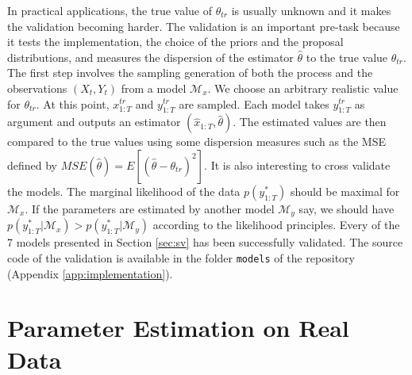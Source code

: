 \documentclass[11pt,a4,twosided,singlespacing,titlepagenumber=on]{scrreprt}
\numberwithin{equation}{chapter} %
\theoremstyle{remark}
\begin{document}
In practical applications, the true value of $\theta_{tr}$ is usually unknown and it makes the validation becoming harder. The validation is an important pre-task because it tests the implementation, the choice of the priors and the proposal distributions, and measures the dispersion of the estimator $\hat{\theta}$ to the true value $\theta_{tr}$. The first step involves the sampling generation of both the process and the observations $(X_t, Y_t)$ from a model $\mathcal{M}_x$. We choose an arbitrary realistic value for $\theta_{tr}$. At this point, $x^{tr}_{1:T}$ and $y^{tr}_{1:T}$ are sampled. Each model takes $y^{tr}_{1:T}$ as argument and outputs an estimator $(\hat{x}_{1:T}, \hat{\theta})$. The estimated values are then compared to the true values using some dispersion measures such as the MSE defined by $MSE(\hat{\theta}) = E[ ( \hat{\theta} - \theta_{tr} )^2 ]$. It is also interesting to cross validate the models. The marginal likelihood of the data $p(y^*_{1:T})$ should be maximal for $\mathcal{M}_x$. If the parameters are estimated by another model $\mathcal{M}_y$ say, we should have $p(y^*_{1:T} | \mathcal{M}_x) > p(y^*_{1:T} | \mathcal{M}_y)$ according to the likelihood principles. Every of the 7 models presented in Section \ref{sec:sv} has been successfully validated. The source code of the validation is available in the folder \texttt{models} of the repository (Appendix \ref{app:implementation}).

\section{Parameter Estimation on Real Data}
\end{document}
